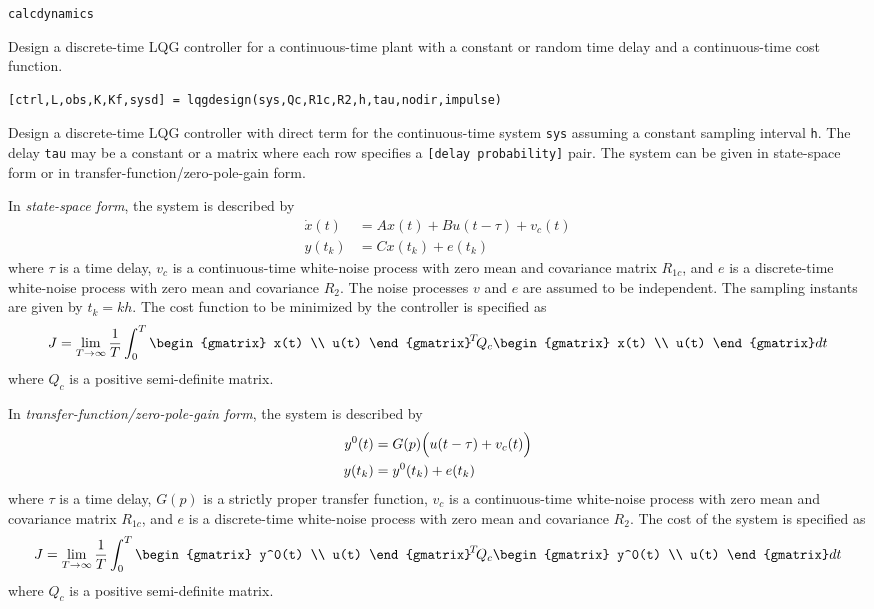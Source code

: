 \documentclass[final,twoside]{rapport}  %
\begin{document}
\seealso
{\tt calcdynamics}



\label{sec:lqgdesign}

\purpose Design a discrete-time LQG controller for a continuous-time plant with
a constant or random time delay and a continuous-time cost function.

\syntax
\begin{verbatim}
[ctrl,L,obs,K,Kf,sysd] = lqgdesign(sys,Qc,R1c,R2,h,tau,nodir,impulse)
\end{verbatim}

\descr
Design a discrete-time LQG controller with direct term for the
continuous-time system {\tt sys} assuming a constant sampling interval
{\tt h}. The delay {\tt tau} may be a constant or a matrix where each row
specifies a {\tt [delay probability]} pair. The system can be given
in state-space form or in transfer-function/zero-pole-gain form.

In {\em state-space form}, the system is described by
\[
\begin{aligned}
\dot x(t) &= A x(t) + B u(t-\tau) + v_c(t) \\
y(t_k) &= C x(t_k) + e(t_k)
\end{aligned}
\]
where $\tau$ is a time delay, $v_c$ is a continuous-time
white-noise process with zero 
mean and covariance matrix $R_{1c}$, and $e$ is a discrete-time 
white-noise process with zero mean and covariance $R_2$. The noise
processes $v$ and $e$ are assumed to be independent. The sampling
instants are given by $t_k = kh$. The cost function to be minimized by
the controller is specified as  
\[
J = \lim_{T \rightarrow \infty} \frac{1}{T} \int_0^T
  \begin{gmatrix} x(t) \\ u(t) \end{gmatrix}^{\!T} \!Q_c \begin{gmatrix} x(t)
    \\ u(t) \end{gmatrix} dt
\]
where $Q_c$ is a positive semi-definite matrix.

In {\em transfer-function/zero-pole-gain form}, the system is described by
\[
\begin{aligned}
y^0(t) &= G(p) \Bigl( u(t-\tau) + v_c(t) \Bigr) \\
y(t_k) &= y^0(t_k) + e(t_k)
\end{aligned}
\]
where $\tau$ is a time delay, $G(p)$ is a strictly proper
transfer function, $v_c$ is a continuous-time white-noise process with
zero mean and 
covariance matrix $R_{1c}$, and $e$ is a discrete-time white-noise process with
zero mean and covariance $R_2$. The cost of the 
system is specified as
\[
J = \lim_{T \rightarrow \infty} \frac{1}{T} \int_0^T
  \begin{gmatrix} y^0(t) \\ u(t) \end{gmatrix}^{\!T} \!Q_c \begin{gmatrix} y^0(t)
    \\ u(t) \end{gmatrix} dt
\]
where $Q_c$ is a positive semi-definite matrix.
\end{document}
